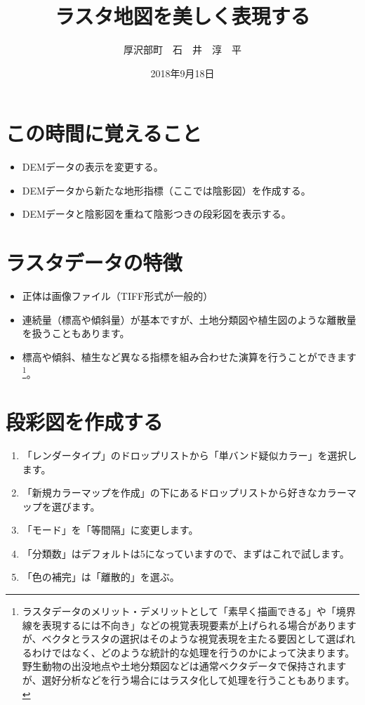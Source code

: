 \documentclass[14Q,twocolumn]{jsarticle}
\title{ラスタ地図を美しく表現する}%
\date{2018年9月18日}
\author{厚沢部町　石　井　淳　平}              %
\begin{document}
\maketitle
\section{この時間に覚えること}
\begin{itemize}
\item DEMデータの表示を変更する。
\item DEMデータから新たな地形指標（ここでは陰影図）を作成する。
\item DEMデータと陰影図を重ねて陰影つきの段彩図を表示する。
\end{itemize}

\section{ラスタデータの特徴}
\begin{itemize}
\item 正体は画像ファイル（TIFF形式が一般的）
\item 連続量（標高や傾斜量）が基本ですが、土地分類図や植生図のような離散量を扱うこともあります。
\item 標高や傾斜、植生など異なる指標を組み合わせた演算を行うことができます\footnote{
ラスタデータのメリット・デメリットとして「素早く描画できる」や「境界線を表現するには不向き」などの視覚表現要素が上げられる場合がありますが、ベクタとラスタの選択はそのような視覚表現を主たる要因として選ばれるわけではなく、どのような統計的な処理を行うのかによって決まります。野生動物の出没地点や土地分類図などは通常ベクタデータで保持されますが、選好分析などを行う場合にはラスタ化して処理を行うこともあります。
}。
\end{itemize}

\section{段彩図を作成する}
\begin{enumerate}
\item 「レンダータイプ」のドロップリストから「単バンド疑似カラー」を選択します。
\item 「新規カラーマップを作成」の下にあるドロップリストから好きなカラーマップを選びます。
\item 「モード」を「等間隔」に変更します。
\item 「分類数」はデフォルトは5になっていますので、まずはこれで試します。
\item 「色の補完」は「離散的」を選ぶ。
\end{enumerate}
\end{document}
